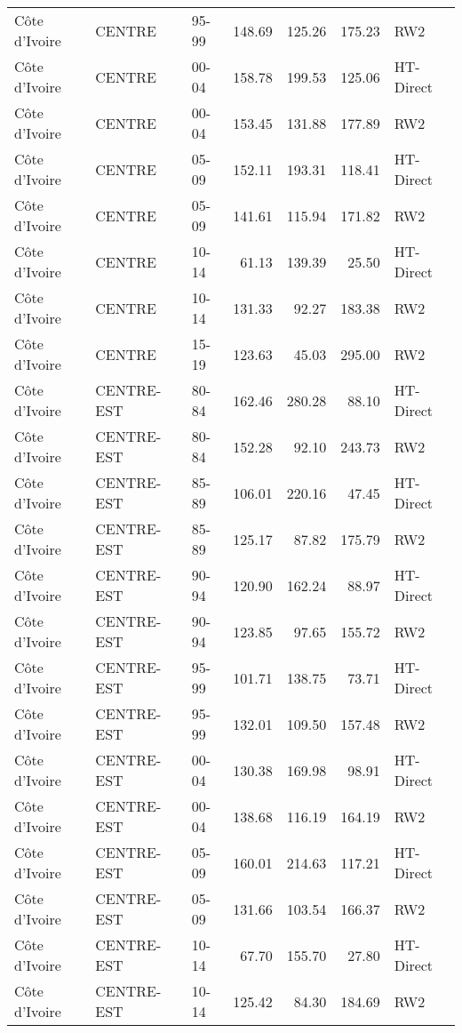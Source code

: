 \begin{longtable}{lllrrrl}
  C\^{o}te d'Ivoire & CENTRE & 95-99 & 148.69 & 125.26 & 175.23 & RW2 \\ 
  C\^{o}te d'Ivoire & CENTRE & 00-04 & 158.78 & 199.53 & 125.06 & HT-Direct \\ 
  C\^{o}te d'Ivoire & CENTRE & 00-04 & 153.45 & 131.88 & 177.89 & RW2 \\ 
  C\^{o}te d'Ivoire & CENTRE & 05-09 & 152.11 & 193.31 & 118.41 & HT-Direct \\ 
  C\^{o}te d'Ivoire & CENTRE & 05-09 & 141.61 & 115.94 & 171.82 & RW2 \\ 
  C\^{o}te d'Ivoire & CENTRE & 10-14 & 61.13 & 139.39 & 25.50 & HT-Direct \\ 
  C\^{o}te d'Ivoire & CENTRE & 10-14 & 131.33 & 92.27 & 183.38 & RW2 \\ 
  C\^{o}te d'Ivoire & CENTRE & 15-19 & 123.63 & 45.03 & 295.00 & RW2 \\ 
  C\^{o}te d'Ivoire & CENTRE-EST & 80-84 & 162.46 & 280.28 & 88.10 & HT-Direct \\ 
  C\^{o}te d'Ivoire & CENTRE-EST & 80-84 & 152.28 & 92.10 & 243.73 & RW2 \\ 
  C\^{o}te d'Ivoire & CENTRE-EST & 85-89 & 106.01 & 220.16 & 47.45 & HT-Direct \\ 
  C\^{o}te d'Ivoire & CENTRE-EST & 85-89 & 125.17 & 87.82 & 175.79 & RW2 \\ 
  C\^{o}te d'Ivoire & CENTRE-EST & 90-94 & 120.90 & 162.24 & 88.97 & HT-Direct \\ 
  C\^{o}te d'Ivoire & CENTRE-EST & 90-94 & 123.85 & 97.65 & 155.72 & RW2 \\ 
  C\^{o}te d'Ivoire & CENTRE-EST & 95-99 & 101.71 & 138.75 & 73.71 & HT-Direct \\ 
  C\^{o}te d'Ivoire & CENTRE-EST & 95-99 & 132.01 & 109.50 & 157.48 & RW2 \\ 
  C\^{o}te d'Ivoire & CENTRE-EST & 00-04 & 130.38 & 169.98 & 98.91 & HT-Direct \\ 
  C\^{o}te d'Ivoire & CENTRE-EST & 00-04 & 138.68 & 116.19 & 164.19 & RW2 \\ 
  C\^{o}te d'Ivoire & CENTRE-EST & 05-09 & 160.01 & 214.63 & 117.21 & HT-Direct \\ 
  C\^{o}te d'Ivoire & CENTRE-EST & 05-09 & 131.66 & 103.54 & 166.37 & RW2 \\ 
  C\^{o}te d'Ivoire & CENTRE-EST & 10-14 & 67.70 & 155.70 & 27.80 & HT-Direct \\ 
  C\^{o}te d'Ivoire & CENTRE-EST & 10-14 & 125.42 & 84.30 & 184.69 & RW2 \\ 

\end{longtable}
